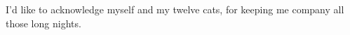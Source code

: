 \section*{}

I'd like to acknowledge myself and my twelve cats, for keeping me company all those long nights.

